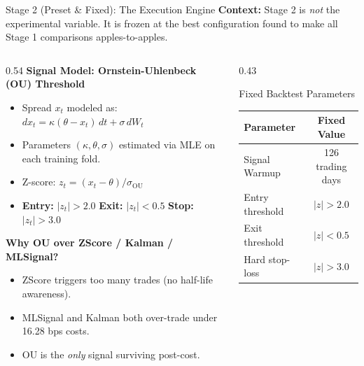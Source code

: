 \documentclass[aspectratio=169,10pt]{beamer}
\begin{document}
\begin{frame}{Stage 2 (Preset \& Fixed): The Execution Engine}
  \small\textbf{Context:} Stage 2 is \emph{not} the experimental variable. It is frozen at the best configuration found to make all Stage 1 comparisons apples-to-apples.
  \vspace{4pt}
  \begin{columns}[T]
    \begin{column}{0.54\textwidth}
      \textbf{Signal Model: Ornstein-Uhlenbeck (OU) Threshold}
      \begin{itemize}\itemsep3pt
        \item Spread $x_t$ modeled as: $dx_t = \kappa(\theta - x_t)\,dt + \sigma\,dW_t$
        \item Parameters $(\kappa, \theta, \sigma)$ estimated via MLE on each training fold.
        \item Z-score: $z_t = (x_t - \theta) / \sigma_{\mathrm{OU}}$
        \item \textbf{Entry:} $|z_t|>2.0$ \quad \textbf{Exit:} $|z_t|<0.5$ \quad \textbf{Stop:} $|z_t|>3.0$
      \end{itemize}
      \vspace{4pt}
      \textbf{Why OU over ZScore / Kalman / MLSignal?}
      \begin{itemize}\itemsep2pt
        \item ZScore triggers too many trades (no half-life awareness).
        \item MLSignal and Kalman both over-trade under 16.28 bps costs.
        \item OU is the \emph{only} signal surviving post-cost.
      \end{itemize}
    \end{column}
    \begin{column}{0.43\textwidth}
      \begin{block}{Fixed Backtest Parameters}
        \centering\scriptsize
        \renewcommand{\arraystretch}{1.3}
        \begin{tabular}{lc}
          \toprule
          \textbf{Parameter} & \textbf{Fixed Value} \\
          \midrule
          Signal Warmup      & 126 trading days \\
          Entry threshold    & $|z|>2.0$ \\
          Exit threshold     & $|z|<0.5$ \\
          Hard stop-loss     & $|z|>3.0$ \\

\end{tabular}
\end{block}
\end{column}
\end{columns}
\end{frame}
\end{document}
